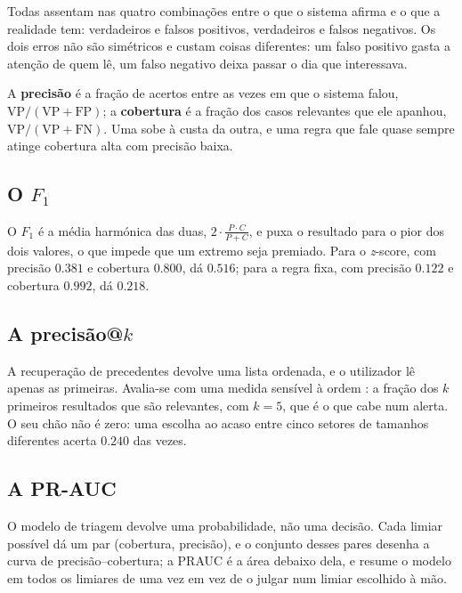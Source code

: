 Todas assentam nas quatro combinações entre o que o sistema afirma e o que a realidade tem:
verdadeiros e falsos positivos, verdadeiros e falsos negativos. Os dois erros não são simétricos e
custam coisas diferentes: um falso positivo gasta a atenção de quem lê, um falso negativo deixa
passar o dia que interessava.

A \textbf{precisão} é a fração de acertos entre as vezes em que o sistema falou,
$\mathrm{VP}/(\mathrm{VP}+\mathrm{FP})$; a \textbf{cobertura} é a fração dos casos relevantes que
ele apanhou, $\mathrm{VP}/(\mathrm{VP}+\mathrm{FN})$. Uma sobe à custa da outra, e uma regra que
fale quase sempre atinge cobertura alta com precisão baixa.

\subsection{O \texorpdfstring{$F_1$}{F1}}
\label{sec:av_f1}

O $F_1$ é a média harmónica das duas, $2 \cdot \frac{P \cdot C}{P + C}$, e puxa o resultado para o
pior dos dois valores, o que impede que um extremo seja premiado. Para o \emph{z}-score, com
precisão $0.381$ e cobertura $0.800$, dá $0.516$; para a regra fixa, com precisão $0.122$ e
cobertura $0.992$, dá $0.218$.

\subsection{A precisão@\texorpdfstring{$k$}{k}}

A recuperação de precedentes devolve uma lista ordenada, e o utilizador lê apenas as primeiras.
Avalia-se com uma medida sensível à ordem \autocite{manning2008ir}: a fração dos $k$ primeiros
resultados que são relevantes, com $k = 5$, que é o que cabe num alerta. O seu chão não é zero: uma
escolha ao acaso entre cinco setores de tamanhos diferentes acerta $0.240$ das vezes.

\subsection{A PR-AUC}
\label{sec:av_prauc}

O modelo de triagem devolve uma probabilidade, não uma decisão. Cada limiar possível dá um par
(cobertura, precisão), e o conjunto desses pares desenha a curva de precisão--cobertura; a
\gls{PRAUC} é a área debaixo dela, e resume o modelo em todos os limiares de uma vez em vez de o
julgar num limiar escolhido à mão.

